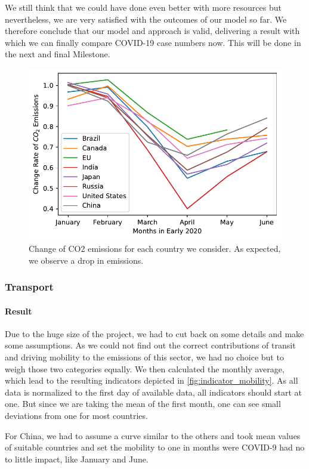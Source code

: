 We still think that we could have done even better with more resources but nevertheless, we are very satisfied with the outcomes of our model so far. We therefore conclude that our model and approach is valid, delivering a result with which we can finally compare COVID-19 case numbers now. This will be done in the next and final Milestone.

\begin{figure}[hb!]
	\centering
	\includegraphics[width=0.7\linewidth]{../predictions/change_rate.pdf}
	\caption{Change of CO2 emissions for each country we consider. As expected, we observe a drop in \co emissions.}
	\label{fig:predictedCO2}
\end{figure}

\subsubsection{Transport}

\paragraph{Result}

Due to the huge size of the project, we had to cut back on some details and make some assumptions. As we could not find out the correct contributions of transit and driving mobility to the \co emissions of this sector, we had no choice but to weigh those two categories equally. We then calculated the monthly average, which lead to the resulting indicators depicted in \autoref{fig:indicator_mobility}. As all data is normalized to the first day of available data, all indicators should start at one. But since we are taking the mean of the first month, one can see small deviations from one for most countries.

For China, we had to assume a curve similar to the others and took mean values of suitable countries and set the mobility to one in months were COVID-9 had no to little impact, like January and June.


